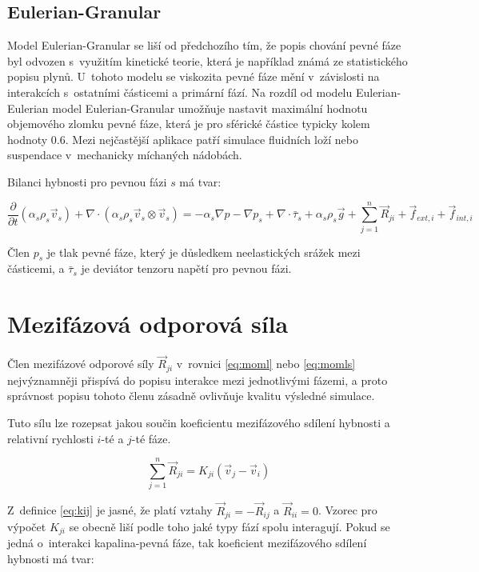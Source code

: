 \subsection{Eulerian-Granular}
\label{sec:egm}
Model Eulerian-Granular se liší od předchozího tím, že  popis chování pevné fáze byl odvozen s~využitím kinetické teorie, která je například známá ze statistického popisu plynů. U~tohoto modelu se viskozita pevné fáze mění v~závislosti na interakcích s~ostatními částicemi a primární fází. Na rozdíl od modelu Eulerian-Eulerian model Eulerian-Granular umožňuje nastavit maximální hodnotu objemového zlomku pevné fáze, která je pro sférické částice typicky kolem hodnoty \num{0.6}. Mezi nejčastější aplikace patří simulace fluidních loží nebo suspendace v~mechanicky míchaných nádobách.

Bilanci hybnosti pro pevnou fázi $s$ má tvar:

\begin{equation}
	\frac{\partial}{\partial t} (\alpha_{s}\rho_{s}\vec{v}_{s}) + \nabla \cdot (\alpha_{s}\rho_{s} \vec{v}_{s} \otimes \vec{v}_{s}) = -\alpha_{s} \nabla p - \nabla p_{s} + \nabla \cdot \bar{\tau}_{s} + \alpha_{s}\rho_{s}\vec{g} + \sum_{j=1}^n \vec{R}_{ji} + \vec{f}_{ext,i} + \vec{f}_{int,i}
	\label{eq:momls}
\end{equation}
  
\noindent Člen $p_{s}$ je tlak pevné fáze, který je důsledkem neelastických srážek mezi částicemi, a $\bar{\tau}_{s}$ je deviátor tenzoru napětí pro pevnou fázi.       

\section{Mezifázová odporová síla}

Člen mezifázové odporové síly $\vec{R}_{ji}$ v~rovnici \ref{eq:moml} nebo \ref{eq:momls} nejvýznamněji přispívá do popisu interakce mezi jednotlivými fázemi, a proto správnost popisu tohoto členu zásadně ovlivňuje kvalitu výsledné simulace. 

Tuto sílu lze rozepsat jakou součin koeficientu mezifázového sdílení hybnosti a relativní rychlosti $i$-té a $j$-té fáze.

\begin{equation}
	\sum_{j=1}^n \vec{R}_{ji} = K_{ji} \left( \vec{v}_{j} - \vec{v}_{i} \right)
	\label{eq:kij}
\end{equation}

\noindent Z~definice \ref{eq:kij} je jasné, že platí vztahy $\vec{R}_{ji} = -\vec{R}_{ij}$ a $\vec{R}_{ii} = 0$. Vzorec pro výpočet $K_{ji}$ se obecně liší podle toho jaké typy fází spolu interagují. Pokud se jedná o~interakci kapalina-pevná fáze, tak koeficient mezifázového sdílení hybnosti má tvar:

